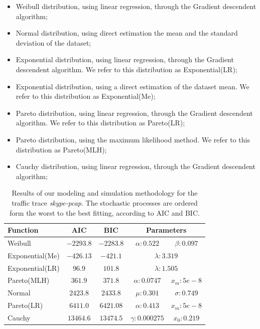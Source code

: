 \begin{itemize}
    \item Weibull distribution, using linear regression, through the Gradient descendent algorithm;
    \item Normal distribution, using direct estimation the mean and the standard deviation of the dataset;
    \item Exponential distribution, using linear regression, through the Gradient descendent algorithm. We refer to this distribution as Exponential(LR);
    \item Exponential distribution, using a direct estimation of the dataset mean. We refer to this distribution as Exponential(Me);
    \item Pareto distribution, using linear regression, through the Gradient descendent algorithm. We refer to this distribution as Pareto(LR);
    \item Pareto distribution, using the maximum likelihood method. We refer to this distribution as Pareto(MLH);
    \item Cauchy distribution, using linear regression, through the Gradient descendent algorithm;
\end{itemize}

\begin{table}[t]
\centering
\caption{Results of our modeling and simulation methodology for the traffic trace \textit{skype-pcap}. The stochastic processes are ordered form the worst to the best fitting, according to AIC and BIC.}
\label{tab:skype-results}
\begin{tabular}{lcccc}
\hline
Function        & AIC         & BIC        & \multicolumn{2}{c}{Parameters}      \\ \hline
Weibull         & $-2293.8$   & $-2283.8$ & $\alpha:0.522$ & $\beta:0.097$  \\
Exponential(Me) & $-426.13$   & $-421.1$  & \multicolumn{2}{c}{$\lambda:3.319$}  \\
Exponential(LR) & $96.9$   & $101.8$  & \multicolumn{2}{c}{$\lambda:1.505$}         \\
Pareto(MLH)     & $361.9$   & $371.8$  & $\alpha:0.0747$ & $x_m:5e-8$       \\
Normal          & $2423.8$    & $2433.8$   & $\mu:0.301 $   & $\sigma:0.749$ \\
Pareto(LR)      & $6411.0$   & $6421.08$  & $\alpha:0.413$ & $x_m:5e-8$       \\
Cauchy          & $13464.6$    & $13474.5$   & $\gamma:0.000275$ & $x_0:0.219$    \\ \hline
\end{tabular}
\end{table}

